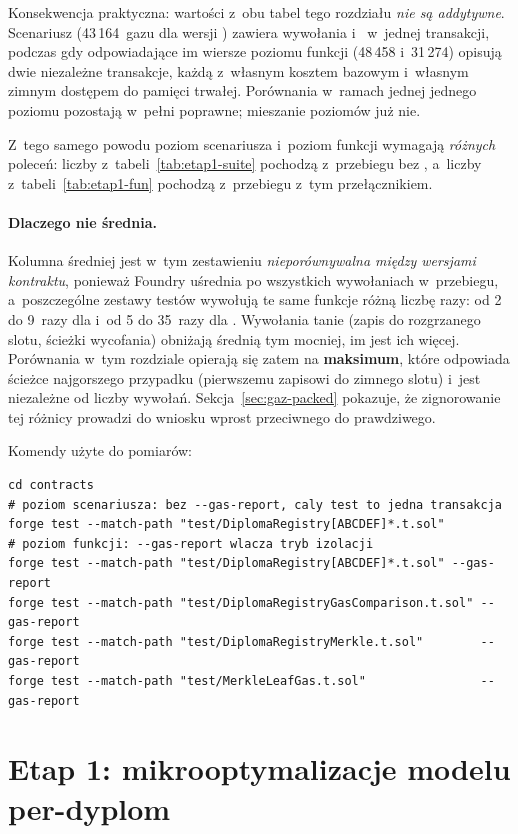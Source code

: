 Konsekwencja praktyczna: wartości z~obu tabel tego rozdziału \emph{nie są
addytywne}. Scenariusz  (43\,164~gazu dla wersji
) zawiera wywołania  i~
w~jednej transakcji, podczas gdy odpowiadające im wiersze poziomu funkcji
(48\,458 i~31\,274) opisują dwie niezależne transakcje, każdą z~własnym kosztem
bazowym i~własnym zimnym dostępem do pamięci trwałej. Porównania w~ramach jednej
jednego poziomu pozostają w~pełni poprawne; mieszanie poziomów już nie.

Z~tego samego powodu poziom scenariusza i~poziom funkcji wymagają
\emph{różnych} poleceń: liczby z~tabeli~\ref{tab:etap1-suite} pochodzą
z~przebiegu bez , a~liczby z~tabeli~\ref{tab:etap1-fun}
pochodzą z~przebiegu z~tym przełącznikiem.

\paragraph{Dlaczego nie średnia.} Kolumna średniej jest w~tym zestawieniu
\emph{nieporównywalna między wersjami kontraktu}, ponieważ Foundry uśrednia po
wszystkich wywołaniach w~przebiegu, a~poszczególne zestawy testów wywołują te
same funkcje różną liczbę razy: od 2 do 9~razy dla  i~od 5 do
35~razy dla . Wywołania tanie (zapis do rozgrzanego slotu,
ścieżki wycofania) obniżają średnią tym mocniej, im jest ich więcej. Porównania
w~tym rozdziale opierają się zatem na \textbf{maksimum}, które odpowiada ścieżce
najgorszego przypadku (pierwszemu zapisowi do zimnego slotu) i~jest
niezależne od liczby wywołań. Sekcja~\ref{sec:gaz-packed} pokazuje, że
zignorowanie tej różnicy prowadzi do wniosku wprost przeciwnego do prawdziwego.

\noindent Komendy użyte do pomiarów:
\begin{verbatim}
cd contracts
# poziom scenariusza: bez --gas-report, caly test to jedna transakcja
forge test --match-path "test/DiplomaRegistry[ABCDEF]*.t.sol"
# poziom funkcji: --gas-report wlacza tryb izolacji
forge test --match-path "test/DiplomaRegistry[ABCDEF]*.t.sol" --gas-report
forge test --match-path "test/DiplomaRegistryGasComparison.t.sol" --gas-report
forge test --match-path "test/DiplomaRegistryMerkle.t.sol"        --gas-report
forge test --match-path "test/MerkleLeafGas.t.sol"                --gas-report
\end{verbatim}

\section{Etap 1: mikrooptymalizacje modelu per-dyplom}
\label{sec:gaz-etap1}

